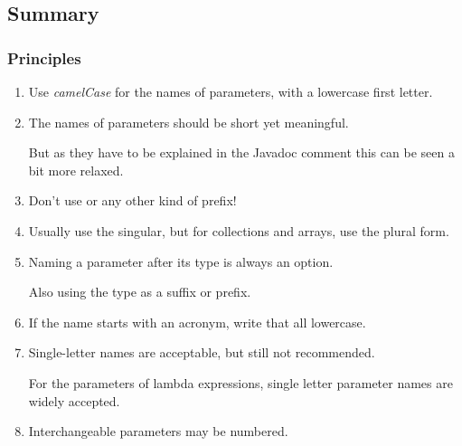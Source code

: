 \subsection{Summary}

\subsubsection{Principles}
\begin{enumerate}[label=P\arabic*.]
	\item{Use \textit{camelCase} for the names of parameters, with a lowercase first letter.}

	\item{The names of parameters should be short yet meaningful.
	
	But as they have to be explained in the Javadoc comment this can be seen a bit more relaxed.}
	
	\item{Don't use  or any other kind of prefix!}
	
	\item{Usually use the singular, but for collections and arrays, use the plural form.}
	
	\item{Naming a parameter after its type is always an option.
	
	Also using the type as a suffix or prefix.}
	
	\item{If the name starts with an acronym, write that all lowercase.}
	
	\item{Single-letter names are acceptable, but still not recommended.
	
	For the parameters of lambda expressions, single letter parameter names are widely accepted.}
	
	\item{Interchangeable parameters may be numbered.}
\end{enumerate}

